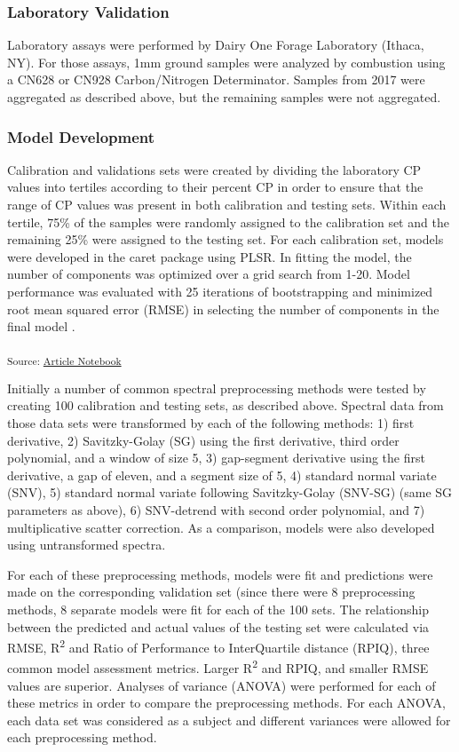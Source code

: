 \documentclass[
]{agujournal2019}
\begin{document}
\subsubsection{Laboratory Validation}\label{laboratory-validation}

Laboratory assays were performed by Dairy One Forage Laboratory (Ithaca,
NY). For those assays, 1mm ground samples were analyzed by combustion
using a CN628 or CN928 Carbon/Nitrogen Determinator. Samples from 2017
were aggregated as described above, but the remaining samples were not
aggregated.

\subsubsection{Model Development}\label{model-development}

Calibration and validations sets were created by dividing the laboratory
CP values into tertiles according to their percent CP in order to ensure
that the range of CP values was present in both calibration and testing
sets. Within each tertile, 75\% of the samples were randomly assigned to
the calibration set and the remaining 25\% were assigned to the testing
set. For each calibration set, models were developed in the caret
package using PLSR. In fitting the model, the number of components was
optimized over a grid search from 1-20. Model performance was evaluated
with 25 iterations of bootstrapping and minimized root mean squared
error (RMSE) in selecting the number of components in the final model .

\textsubscript{Source:
\href{https://rvcrawford.github.io/glowing-system/index.qmd.html}{Article
Notebook}}

Initially a number of common spectral preprocessing methods were tested
by creating 100 calibration and testing sets, as described above.
Spectral data from those data sets were transformed by each of the
following methods: 1) first derivative, 2) Savitzky-Golay (SG) using the
first derivative, third order polynomial, and a window of size 5, 3)
gap-segment derivative using the first derivative, a gap of eleven, and
a segment size of 5, 4) standard normal variate (SNV), 5) standard
normal variate following Savitzky-Golay (SNV-SG) (same SG parameters as
above), 6) SNV-detrend with second order polynomial, and 7)
multiplicative scatter correction. As a comparison, models were also
developed using untransformed spectra.

For each of these preprocessing methods, models were fit and predictions
were made on the corresponding validation set (since there were 8
preprocessing methods, 8 separate models were fit for each of the 100
sets. The relationship between the predicted and actual values of the
testing set were calculated via RMSE, R\textsuperscript{2} and Ratio of
Performance to InterQuartile distance (RPIQ), three common model
assessment metrics. Larger R\textsuperscript{2} and RPIQ, and smaller
RMSE values are superior. Analyses of variance (ANOVA) were performed
for each of these metrics in order to compare the preprocessing methods.
For each ANOVA, each data set was considered as a subject and different
variances were allowed for each preprocessing method.
\end{document}

